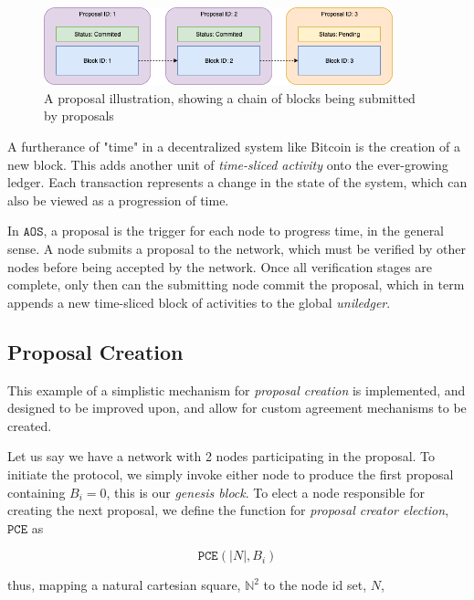 \documentclass[10pt, titlepage, twocolumn]{report}
\newcommand*{\field}[1]{\mathbb{#1}}%
\begin{document}
\begin{figure}[ht]
\centering
	\includegraphics[width=0.9\textwidth]{proposals}
	\caption{A proposal illustration, showing a chain of blocks being submitted by proposals}
	\label{proposals}
\end{figure}

A furtherance of "time" in a decentralized system like Bitcoin is the creation of a new block. This adds another unit of \textit{time-sliced activity} onto the ever-growing ledger. Each transaction represents a change in the state of the system, which can also be viewed as a progression of time.

\hspace*{15pt}
In \(\texttt{AOS}\), a proposal is the trigger for each node to progress time, in the general sense. A node submits a proposal to the network, which must be verified by other nodes before being accepted by the network. Once all verification stages are complete, only then can the submitting node commit the proposal, which in term appends a new time-sliced block of activities to the global \textit{uniledger}.  

\subsection{Proposal Creation}
\hspace*{15pt}
This example of a simplistic mechanism for \textit{proposal creation} is implemented, and designed to be improved upon, and allow for custom agreement mechanisms to be created. 

\hspace*{15pt}
Let us say we have a network with 2 nodes participating in the proposal. To initiate the protocol, we simply invoke either node to produce the first proposal containing \(B_i = 0\), this is our \textit{genesis block}. To elect a node responsible for creating the next proposal, we define the function for \textit{proposal creator election}, \( \texttt{PCE} \) as

\begin{equation}
	\texttt{PCE}( \vert N \vert, B_i )
\end{equation}

thus, mapping a natural cartesian square, \(\field{N}^2\) to the node id set, \(N\),
\end{document}
